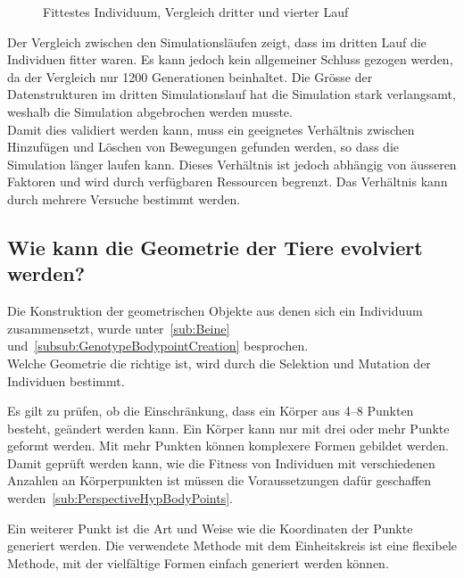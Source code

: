       \begin{figure}[H]
        \centering
        
        \caption{Fittestes Individuum, Vergleich dritter und vierter Lauf}
      \end{figure}

      Der Vergleich zwischen den Simulationsläufen zeigt, dass im dritten Lauf die Individuen fitter waren.
      Es kann jedoch kein allgemeiner Schluss gezogen werden, da der Vergleich nur 1200 Generationen beinhaltet.
      Die Grösse der Datenstrukturen im dritten Simulationslauf hat die Simulation stark verlangsamt,
      weshalb die Simulation abgebrochen werden musste.
      \\
      Damit dies validiert werden kann,
      muss ein geeignetes Verhältnis zwischen Hinzufügen und Löschen von Bewegungen gefunden werden,
      so dass die Simulation länger laufen kann.
      Dieses Verhältnis ist jedoch abhängig von äusseren Faktoren und wird durch verfügbaren Ressourcen begrenzt.
      Das Verhältnis kann durch mehrere Versuche bestimmt werden.

    \subsection{Wie kann die Geometrie der Tiere evolviert werden?}

      Die Konstruktion der geometrischen Objekte aus denen sich ein Individuum zusammensetzt,
      wurde unter~\vref{sub:Beine} und~\vref{subsub:GenotypeBodypointCreation} besprochen.
      \\
      Welche Geometrie die richtige ist, wird durch die Selektion und Mutation der Individuen bestimmt.

      \smallskip


      Es gilt zu prüfen, ob die Einschränkung, dass ein Körper aus 4--8 Punkten besteht, geändert werden kann.
      Ein Körper kann nur mit drei oder mehr Punkte geformt werden.
      Mit mehr Punkten können komplexere Formen gebildet werden.
      \\
      Damit geprüft werden kann,
      wie die Fitness von Individuen mit verschiedenen Anzahlen an Körperpunkten ist
      müssen die Voraussetzungen dafür geschaffen werden~\vref{sub:PerspectiveHypBodyPoints}.

      \smallskip

      Ein weiterer Punkt ist die Art und Weise wie die Koordinaten der Punkte generiert werden.
      Die verwendete Methode mit dem Einheitskreis ist eine flexibele Methode,
      mit der vielfältige Formen einfach generiert werden können.

